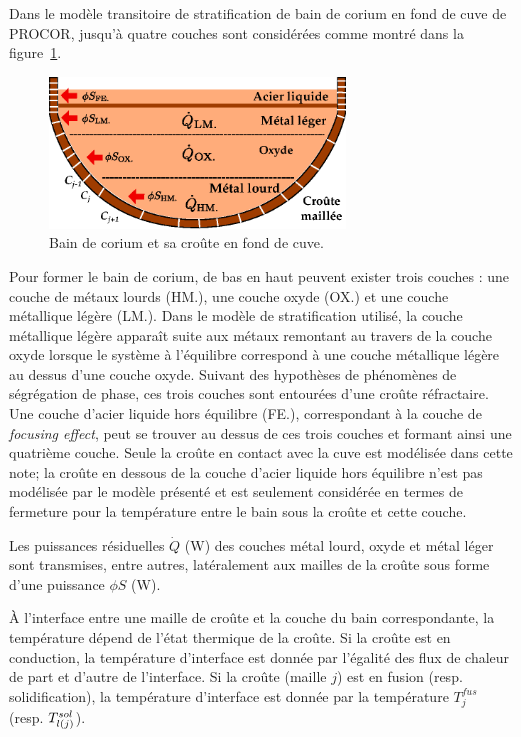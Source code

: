 Dans le modèle transitoire de stratification de bain de corium en fond de cuve de PROCOR, jusqu'à quatre couches sont considérées comme montré dans la figure~\ref{fig:bain_corium_croute}. 
\begin{figure}
\centering
\includegraphics[width=0.7\textwidth, keepaspectratio=true]{Figures/bain_corium_croute.eps}
\caption{Bain de corium et sa croûte en fond de cuve.}
\label{fig:bain_corium_croute}
\end{figure}
Pour former le bain de corium, de bas en haut peuvent exister trois couches : une couche de métaux lourds (HM.), une couche oxyde (OX.) et une couche métallique légère (LM.). Dans le modèle de stratification utilisé, la couche métallique légère apparaît suite aux métaux remontant au travers de la couche oxyde lorsque le système à l'équilibre correspond à une couche métallique légère au dessus d'une couche oxyde. Suivant des hypothèses de phénomènes de ségrégation de phase, ces trois couches sont entourées d'une croûte réfractaire. Une couche d'acier liquide hors équilibre (FE.), correspondant à la couche de \textit{focusing effect}, peut se trouver au dessus de ces trois couches et formant ainsi une quatrième couche. Seule la croûte en contact avec la cuve est modélisée dans cette note; la croûte en dessous de la couche d'acier liquide hors équilibre n'est pas modélisée par le modèle présenté et est seulement considérée en termes de fermeture pour la température entre le bain sous la croûte et cette couche. 

Les puissances résiduelles $\dot{Q}$ (W) des couches métal lourd, oxyde et métal léger sont transmises, entre autres, latéralement aux mailles de la croûte sous forme d'une puissance $\phi S$ (W).

À l'interface entre une maille de croûte et la couche du bain correspondante, la température dépend de l'état thermique de la croûte. Si la croûte est en conduction, la température d'interface est donnée par l'égalité des flux de chaleur de part et d'autre de l'interface. Si la croûte (maille $j$) est en fusion (resp. solidification), la température d'interface est donnée par la température $T_j^{fus}$ (resp. $\temperature[sol]{l(j)}$).

